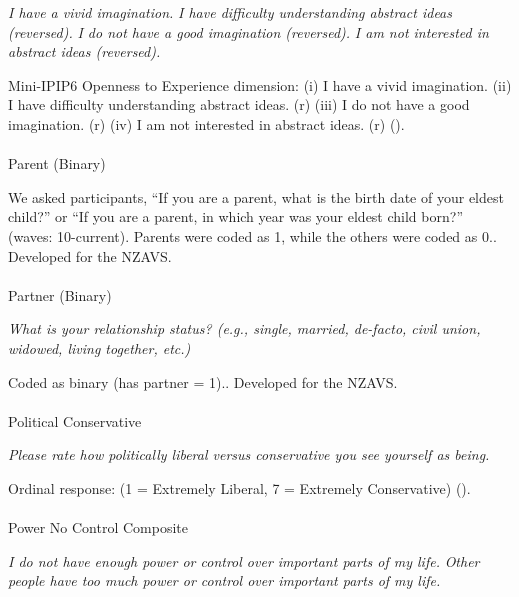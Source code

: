 \documentclass[
  single column]{article}
\makeatletter
\let\oldparagraph\paragraph
\renewcommand{\paragraph}{
    \@ifstar
      \xxxParagraphStar
      \xxxParagraphNoStar
  }
\newcommand{\xxxParagraphStar}[1]{\oldparagraph*{#1}\mbox{}}
\newcommand{\xxxParagraphNoStar}[1]{\oldparagraph{#1}\mbox{}}
\makeatother
\begin{document}
\emph{I have a vivid imagination.} \emph{I have difficulty understanding
abstract ideas (reversed).} \emph{I do not have a good imagination
(reversed).} \emph{I am not interested in abstract ideas (reversed).}

Mini-IPIP6 Openness to Experience dimension: (i) I have a vivid
imagination. (ii) I have difficulty understanding abstract ideas. (r)
(iii) I do not have a good imagination. (r) (iv) I am not interested in
abstract ideas. (r) ().

\paragraph{Parent (Binary)}\label{parent-binary}

We asked participants, ``If you are a parent, what is the birth date of
your eldest child?'' or ``If you are a parent, in which year was your
eldest child born?'' (waves: 10-current). Parents were coded as 1, while
the others were coded as 0.. Developed for the NZAVS.

\paragraph{Partner (Binary)}\label{partner-binary}

\emph{What is your relationship status? (e.g., single, married,
de-facto, civil union, widowed, living together, etc.)}

Coded as binary (has partner = 1).. Developed for the NZAVS.

\paragraph{Political Conservative}\label{political-conservative}

\emph{Please rate how politically liberal versus conservative you see
yourself as being.}

Ordinal response: (1 = Extremely Liberal, 7 = Extremely Conservative)
().

\paragraph{Power No Control Composite}\label{power-no-control-composite}

\emph{I do not have enough power or control over important parts of my
life.} \emph{Other people have too much power or control over important
parts of my life.}
\end{document}
